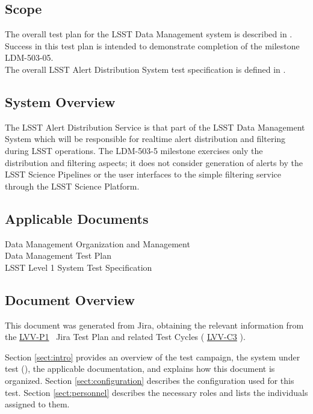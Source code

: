 \documentclass[DM,lsstdraft,STR,toc]{lsstdoc}
\begin{document}
\subsection{Scope}\label{scope}

The overall test plan for the LSST Data Management system is described
in .\\
Success in this test plan is intended to demonstrate completion of the
milestone LDM-503-05.\\
The overall LSST Alert Distribution System test specification is defined
in .



\subsection{System Overview}
\label{sect:systemoverview}

The LSST Alert Distribution Service is that part of the LSST Data
Management System which will be responsible for realtime alert
distribution and filtering during LSST operations. The LDM-503-5
milestone exercises only the distribution and filtering aspects; it does
not consider generation of alerts by the LSST Science Pipelines or the
user interfaces to the simple filtering service through the LSST Science
Platform.\\[2\baselineskip]

\subsection{Applicable Documents}\label{applicable-documents}

 Data Management Organization and Management\\
 Data Management Test Plan\\
 LSST Level 1 System Test Specification


\subsection{Document Overview}
\label{sect:docoverview}

This document was generated from Jira, obtaining the relevant information from the 
\href{https://jira.lsstcorp.org/secure/Tests.jspa#/testPlan/LVV-P1}{LVV-P1}
~Jira Test Plan and related Test Cycles (
  \href{https://jira.lsstcorp.org/secure/Tests.jspa#/testCycle/LVV-C3}{LVV-C3}
).

Section \ref{sect:intro} provides an overview of the test campaign, the system under test (\product{}), the applicable documentation, and explains how this document is organized.
Section \ref{sect:configuration}  describes the configuration used for this test.
Section \ref{sect:personnel} describes the necessary roles and lists the individuals assigned to them.
\end{document}
